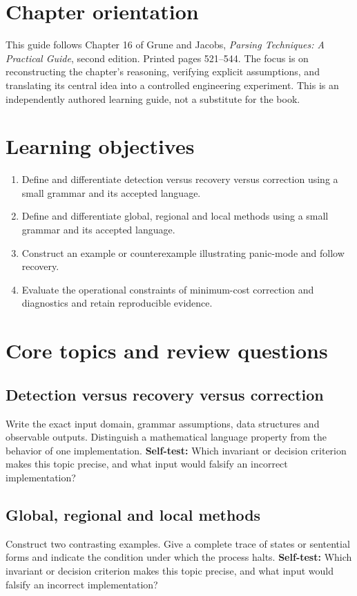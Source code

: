 \documentclass[11pt,letterpaper]{article}
\begin{document}
\makedoctitle\makedocsummary
\tableofcontents\clearpage
\section{Chapter orientation}
This guide follows Chapter 16 of Grune and Jacobs, \emph{Parsing Techniques: A Practical Guide}, second edition. Printed pages 521--544. The focus is on reconstructing the chapter's reasoning, verifying explicit assumptions, and translating its central idea into a controlled engineering experiment. This is an independently authored learning guide, not a substitute for the book.
\section{Learning objectives}
\begin{enumerate}
\item Define and differentiate detection versus recovery versus correction using a small grammar and its accepted language.
\item Define and differentiate global, regional and local methods using a small grammar and its accepted language.
\item Construct an example or counterexample illustrating panic-mode and follow recovery.
\item Evaluate the operational constraints of minimum-cost correction and diagnostics and retain reproducible evidence.
\end{enumerate}
\section{Core topics and review questions}
\subsection{Detection versus recovery versus correction}
Write the exact input domain, grammar assumptions, data structures and observable outputs. Distinguish a mathematical language property from the behavior of one implementation.
\textbf{Self-test:} Which invariant or decision criterion makes this topic precise, and what input would falsify an incorrect implementation?
\subsection{Global, regional and local methods}
Construct two contrasting examples. Give a complete trace of states or sentential forms and indicate the condition under which the process halts.
\textbf{Self-test:} Which invariant or decision criterion makes this topic precise, and what input would falsify an incorrect implementation?
\end{document}
